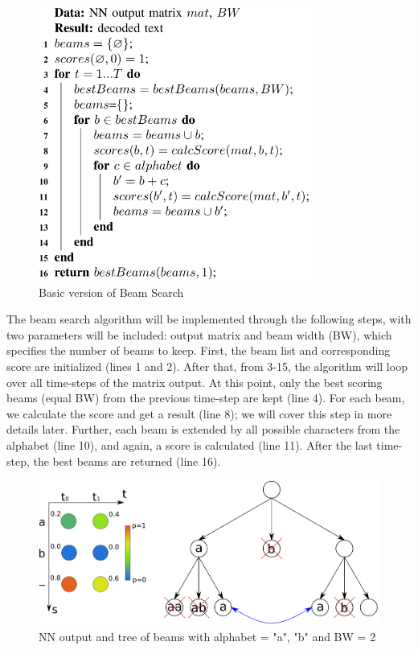 \begin{figure}[H]
	\centering
	\includegraphics[width=0.8\textwidth]{img/Chap3/Basic-Version-BeamSearch}
	\caption{ Basic version of Beam Search }
	\label{fig:Chap3-Basic-Version-BeamSearch}
\end{figure}


The beam search algorithm will be implemented through the following steps, with two parameters will be included: output matrix and beam width (BW), which specifies the number of beams to keep. First, the beam list and corresponding score are initialized (lines 1 and 2). After that, from 3-15, the algorithm will loop over all time-steps of the matrix output. At this point, only the best scoring beams (equal BW) from the previous time-step are kept (line 4). For each beam, we calculate the score and get a result (line 8); we will cover this step in more details later. Further, each beam is extended by all possible characters from the alphabet (line 10), and again, a score is calculated (line 11). After the last time-step, the best beams are returned (line 16).


\begin{figure}[H]
	\centering
	\includegraphics[width=\textwidth]{img/Chap3/BeamSearchTree}
	\caption{ NN output and tree of beams with alphabet = {"a", "b"} and BW = 2 }
	\label{fig:Chap3-BSTree}
\end{figure}

